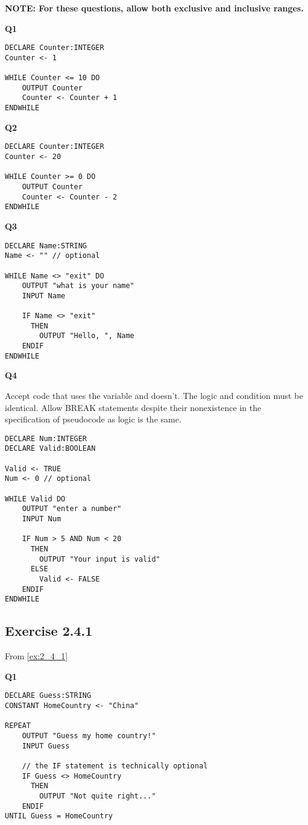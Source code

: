 \documentclass[./main.tex]{subfiles}
\begin{document}
\textbf{NOTE: For these questions, allow both exclusive and inclusive ranges.}

\textbf{Q1}
\begin{verbatim}
DECLARE Counter:INTEGER
Counter <- 1

WHILE Counter <= 10 DO
    OUTPUT Counter
    Counter <- Counter + 1
ENDWHILE
\end{verbatim}

\textbf{Q2}
\begin{verbatim}
DECLARE Counter:INTEGER
Counter <- 20

WHILE Counter >= 0 DO    
    OUTPUT Counter
    Counter <- Counter - 2
ENDWHILE
\end{verbatim}

\textbf{Q3}
\begin{verbatim}
DECLARE Name:STRING
Name <- "" // optional

WHILE Name <> "exit" DO   
    OUTPUT "what is your name"
    INPUT Name

    IF Name <> "exit"
      THEN
        OUTPUT "Hello, ", Name
    ENDIF
ENDWHILE
\end{verbatim}

\textbf{Q4}

Accept code that uses the variable and doesn't. The logic and condition must be identical. Allow {\ccmono BREAK} statements despite their nonexistence in the specification of pseudocode as logic is the same.

\begin{verbatim}
DECLARE Num:INTEGER
DECLARE Valid:BOOLEAN

Valid <- TRUE
Num <- 0 // optional

WHILE Valid DO
    OUTPUT "enter a number"
    INPUT Num

    IF Num > 5 AND Num < 20
      THEN
        OUTPUT "Your input is valid"
      ELSE
        Valid <- FALSE
    ENDIF
ENDWHILE
\end{verbatim}

\newpage
\subsection*{Exercise 2.4.1}
From \ref{ex:2_4_1}

\textbf{Q1}
\begin{verbatim}
DECLARE Guess:STRING
CONSTANT HomeCountry <- "China"

REPEAT
    OUTPUT "Guess my home country!"
    INPUT Guess

    // the IF statement is technically optional
    IF Guess <> HomeCountry
      THEN
        OUTPUT "Not quite right..."
    ENDIF
UNTIL Guess = HomeCountry
\end{verbatim}
\end{document}
